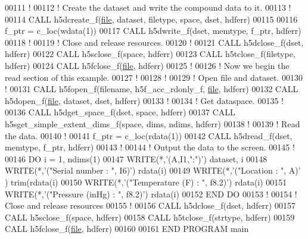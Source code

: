 \begin{DoxyCode}
00111   \textcolor{comment}{!}
00112   \textcolor{comment}{! Create the dataset and write the compound data to it.}
00113   \textcolor{comment}{!}
00114   \textcolor{keyword}{CALL }h5dcreate\_f(\hyperlink{structfile}{file}, dataset, filetype, space, dset, hdferr)
00115 
00116   f\_ptr = c\_loc(wdata(1))
00117   \textcolor{keyword}{CALL }h5dwrite\_f(dset, memtype, f\_ptr, hdferr)
00118   \textcolor{comment}{!}
00119   \textcolor{comment}{! Close and release resources.}
00120   \textcolor{comment}{!}
00121   \textcolor{keyword}{CALL }h5dclose\_f(dset, hdferr)
00122   \textcolor{keyword}{CALL }h5sclose\_f(space, hdferr)
00123   \textcolor{keyword}{CALL }h5tclose\_f(filetype, hdferr)
00124   \textcolor{keyword}{CALL }h5fclose\_f(\hyperlink{structfile}{file}, hdferr)
00125   \textcolor{comment}{!}
00126   \textcolor{comment}{! Now we begin the read section of this example.}
00127   \textcolor{comment}{!}
00128   \textcolor{comment}{!}
00129   \textcolor{comment}{! Open file and dataset.}
00130   \textcolor{comment}{!}
00131   \textcolor{keyword}{CALL }h5fopen\_f(filename, h5f\_acc\_rdonly\_f, \hyperlink{structfile}{file}, hdferr)
00132   \textcolor{keyword}{CALL }h5dopen\_f(\hyperlink{structfile}{file}, dataset, dset, hdferr)
00133   \textcolor{comment}{!}
00134   \textcolor{comment}{! Get dataspace.}
00135   \textcolor{comment}{!}
00136   \textcolor{keyword}{CALL }h5dget\_space\_f(dset, space, hdferr)
00137   \textcolor{keyword}{CALL }h5sget\_simple\_extent\_dims\_f(space, dims, ndims, hdferr)
00138   \textcolor{comment}{!}
00139   \textcolor{comment}{! Read the data.}
00140   \textcolor{comment}{!}
00141   f\_ptr = c\_loc(rdata(1))
00142   \textcolor{keyword}{CALL }h5dread\_f(dset, memtype, f\_ptr, hdferr)
00143   \textcolor{comment}{!}
00144   \textcolor{comment}{! Output the data to the screen.}
00145   \textcolor{comment}{!}
00146   \textcolor{keywordflow}{DO} i = 1, ndims(1)
00147      \textcolor{keyword}{WRITE}(*,\textcolor{stringliteral}{'(A,I1,":")'}) dataset, i
00148      \textcolor{keyword}{WRITE}(*,\textcolor{stringliteral}{'("Serial number   : ", I6)'}) rdata(i)%
00149      \textcolor{keyword}{WRITE}(*,\textcolor{stringliteral}{'("Location        : ", A)'} ) trim(rdata(i)%
00150      \textcolor{keyword}{WRITE}(*,\textcolor{stringliteral}{'("Temperature (F) : ", f8.2)'}) rdata(i)%
00151      \textcolor{keyword}{WRITE}(*,\textcolor{stringliteral}{'("Pressure (inHg) : ", f8.2)'}) rdata(i)%
00152 \textcolor{keywordflow}{  END DO}
00153   \textcolor{comment}{!}
00154   \textcolor{comment}{! Close and release resources}
00155   \textcolor{comment}{!}
00156   \textcolor{keyword}{CALL }h5dclose\_f(dset, hdferr)
00157   \textcolor{keyword}{CALL }h5sclose\_f(space, hdferr)
00158   \textcolor{keyword}{CALL }h5tclose\_f(strtype, hdferr)
00159   \textcolor{keyword}{CALL }h5fclose\_f(\hyperlink{structfile}{file}, hdferr)
00160 
00161 \textcolor{keyword}{END PROGRAM }main
\end{DoxyCode}
